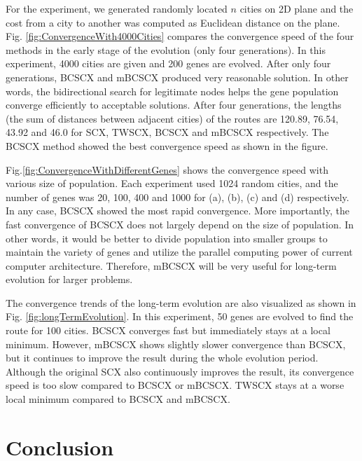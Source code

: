 For the experiment, we generated randomly located $n$ cities on 2D plane and the cost from a city to another was computed as Euclidean distance on the plane. Fig. \ref{fig:ConvergenceWith4000Cities} compares the convergence speed of the four methods in the early stage of the evolution (only four generations). In this experiment, 4000 cities are given and 200 genes are evolved. After only four generations, BCSCX and mBCSCX produced very reasonable solution. In other words, the bidirectional search for legitimate nodes helps the gene population converge efficiently to acceptable solutions. After four generations, the lengths (the sum of distances between adjacent cities) of the routes are 120.89, 76.54, 43.92 and 46.0 for SCX, TWSCX, BCSCX and mBCSCX respectively. The BCSCX method showed the best convergence speed as shown in the figure. 


Fig.\ref{fig:ConvergenceWithDifferentGenes} shows the convergence speed with various size of population. Each experiment used 1024 random cities, and the number of genes was 20, 100, 400 and 1000 for (a), (b), (c) and (d) respectively. In any case, BCSCX showed the most rapid convergence. More importantly, the fast convergence of BCSCX does not largely depend on the size of population. In other words, it would be better to divide population into smaller groups to maintain the variety of genes and utilize the parallel computing power of current computer architecture. Therefore, mBCSCX will be very useful for long-term evolution for larger problems.

The convergence trends of the long-term evolution are also visualized as shown in Fig. \ref{fig:longTermEvolution}. In this experiment, 50 genes are evolved to find the route for 100 cities. BCSCX converges fast but immediately stays at a local minimum. However, mBCSCX shows slightly slower convergence than BCSCX, but it continues to improve the result during the whole evolution period. Although the original SCX also continuously improves the result, its convergence speed is too slow compared to BCSCX or mBCSCX. TWSCX stays at a worse local minimum compared to BCSCX and mBCSCX.



\section{Conclusion}


